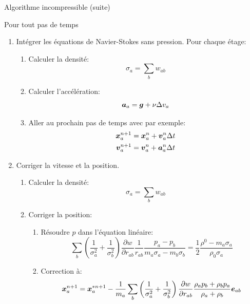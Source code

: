  \begin{frame}[<*>][shrink]{Algorithme incompressible (suite)}
\begin{block}{Pour tout pas de temps}
	\begin{enumerate}
		\item Intégrer les équations de Navier-Stokes sans pression.  Pour chaque étage:
		\begin{enumerate}
			\item Calculer la densité:
			\begin{equation*}
			\sigma_{a}=\sum_{b}w_{ab}
			\end{equation*}
			\item Calculer l'accélération:
			\begin{equation*}
			{\boldsymbol {a}}_a={\boldsymbol {g}}+\nu \Delta v_{a}
			\end{equation*}
			\item Aller au prochain pas de temps avec par exemple:
			\begin{align*}
			{\boldsymbol {x}}^{n+1}_{a}&={\boldsymbol {x}}^{n}_{a}+{\boldsymbol {v}}^{n}_a\Delta t\\
			{\boldsymbol {v}}^{n+1}_{a}&={\boldsymbol {v}}^{n}_{a}+{\boldsymbol {a}}^{n}_{a}\Delta t
			\end{align*}
		\end{enumerate}
		\item Corriger la vitesse et la position.
		\begin{enumerate}
			\item Calculer la densité:
			\begin{equation*}
			\sigma_{a}=\sum_{b}w_{ab}
			\end{equation*}
			\item Corriger la position:
			\begin{enumerate}
				\item Résoudre $p$ dans l'équation linéaire:
				\begin{equation*}
				\sum_{b}\left(\frac{1}{\sigma_{a}^2}+\frac{1}{\sigma_{b}^2}\right)\frac{\partial w}{\partial r_{ab}}\frac{1}{r_{ab}}\frac{p_a-p_b}{m_a\sigma_{a}-m_{b}\sigma_{b}} =\frac{1}{2}\frac{\rho^{0}-m_{a}\sigma_{a}}{\rho_{0}\sigma_{a}}
				\end{equation*}
				\item Correction à:
				\begin{equation*}
				{\boldsymbol {x}}^{n+1}_{a}={\boldsymbol {x}}^{*n+1}_{a}-\frac{1}{m_a}\sum_{b}\left(\frac{1}{\sigma_{a}^2}+\frac{1}{\sigma_{b}^2}\right)\frac{\partial w}{\partial r_{ab}}\frac{\rho_{a}p_{b}+\rho_{b}p_{a}}{\rho_a+\rho_b}{\boldsymbol {e}}_{ab}
				\end{equation*}

\end{enumerate}
\end{enumerate}
\end{enumerate}
\end{block}
\end{frame}
